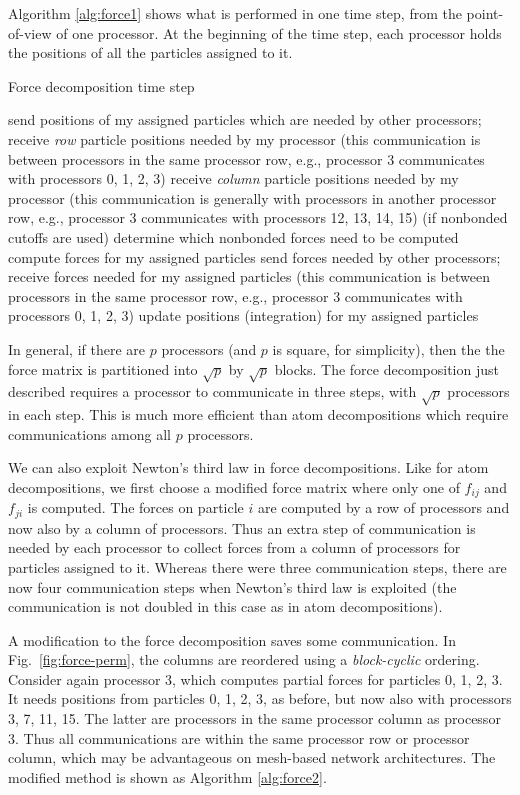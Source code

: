Algorithm \ref{alg:force1} shows what is performed in one time step,
from the point-of-view of one processor.
At the beginning of the time step, each processor
holds the positions of all the particles assigned to it.
\begin{algorithm}
\caption{Force decomposition time step}
\label{alg:force1}
\begin{algorithmic}[1]
\STATE send positions of my assigned particles which are needed by
other processors; receive {\em row} particle positions needed by my processor
(this communication is between processors in the same processor row, e.g., processor
3 communicates with processors 0, 1, 2, 3)
\STATE receive {\em column} particle positions needed by my processor
(this communication is generally with processors in another processor row, e.g.,
processor 3 communicates with processors 12, 13, 14, 15)
\STATE (if nonbonded cutoffs are used) determine which nonbonded forces need to be computed
\STATE compute forces for my assigned particles
\STATE send forces needed by other processors; receive forces needed for my
assigned particles (this communication is between processors in the same 
processor row, e.g., processor 3 communicates with processors 0, 1, 2, 3)
\STATE update positions (integration) for my assigned particles
\end{algorithmic}
\end{algorithm}

In general, if there are $p$ processors (and $p$ is square, for simplicity),
then the the force matrix is partitioned into $\sqrt{p}$ by $\sqrt{p}$ blocks.
The force decomposition just described requires a processor to communicate
in three steps, with $\sqrt{p}$ processors in each step.  This is much 
more efficient than atom decompositions which require communications among all
$p$ processors.

We can also exploit Newton's third law in force decompositions.
Like for atom decompositions, we first choose a modified force matrix
where only one of $f_{ij}$ and $f_{ji}$ is computed.  The forces
on particle $i$ are computed by a row of processors and now also by
a column of processors.  Thus an extra step of communication is needed
by each processor to collect forces from a column of processors
for particles assigned to it.  
Whereas there were three
communication steps, there are now four communication steps when
Newton's third law is exploited (the communication is not doubled
in this case as in atom decompositions).

A modification to the force decomposition saves some communication.
In Fig.~\ref{fig:force-perm}, the columns are reordered using a 
{\em block-cyclic} ordering.  Consider again processor 3, which computes
partial forces for particles 0, 1, 2, 3.  It needs positions from
particles 0, 1, 2, 3, as before, but now also with processors 3, 7,
11, 15.  The latter are processors in the same processor column as
processor 3.  Thus all communications are within the same processor row
or processor column, which may be advantageous on mesh-based network
architectures.  The modified method is shown as
Algorithm \ref{alg:force2}.

